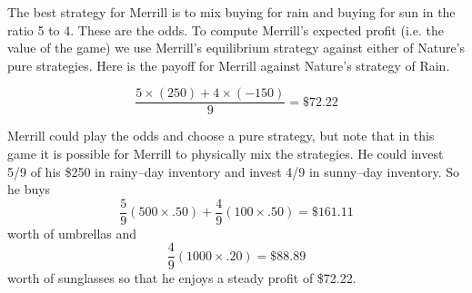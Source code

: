 The best strategy for Merrill is to mix buying for rain and buying
for sun in the ratio 5 to 4. These are the odds. To compute 
Merrill's expected profit (i.e. the value of the game) we use
Merrill's  equilibrium strategy against either of Nature's
pure strategies. Here is the payoff for Merrill against
Nature's strategy of Rain.

\[ \frac{5 \times (250) + 4 \times (-150)}{9} = \$72.22 \]

Merrill could play the odds and choose a pure strategy, but 
note that in this game it is possible for Merrill to physically
mix the strategies. He could invest 5/9 of his \$250 in
rainy--day inventory and invest 4/9 in sunny--day inventory.
So he buys
\[ \frac{5}{9} \left(500 \times .50\right) + \frac{4}{9} \left(100 \times .50\right) = \$161.11 \]
worth of umbrellas and
\[ \frac{4}{9} \left(1000 \times .20\right) = \$88.89 \]
worth of sunglasses so that he enjoys a steady profit of \$72.22.

